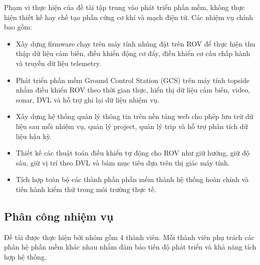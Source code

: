 \documentclass[../DoAn.tex]{subfiles}
\begin{document}
Phạm vi thực hiện của đề tài tập trung vào phát triển phần mềm, không thực hiện thiết kế hay chế tạo phần cứng cơ khí và mạch điện tử. Các nhiệm vụ chính bao gồm:

\begin{itemize}
    \item Xây dựng firmware chạy trên máy tính nhúng đặt trên ROV để thực hiện thu thập dữ liệu cảm biến, điều khiển động cơ đẩy, điều khiển cơ cấu chấp hành và truyền dữ liệu telemetry.
    
    \item Phát triển phần mềm Ground Control Station (GCS) trên máy tính topside nhằm điều khiển ROV theo thời gian thực, hiển thị dữ liệu cảm biến, video, sonar, DVL và hỗ trợ ghi lại dữ liệu nhiệm vụ.
    
    \item Xây dựng hệ thống quản lý thông tin trên nền tảng web cho phép lưu trữ dữ liệu sau mỗi nhiệm vụ, quản lý project, quản lý trip và hỗ trợ phân tích dữ liệu hậu kỳ.
    
    \item Thiết kế các thuật toán điều khiển tự động cho ROV như giữ hướng, giữ độ sâu, giữ vị trí theo DVL và bám mục tiêu dựa trên thị giác máy tính.
    
    \item Tích hợp toàn bộ các thành phần phần mềm thành hệ thống hoàn chỉnh và tiến hành kiểm thử trong môi trường thực tế.
\end{itemize}

\subsection{Phân công nhiệm vụ}
\label{subsection:1.1.3}

Đề tài được thực hiện bởi nhóm gồm 4 thành viên. Mỗi thành viên phụ trách các phân hệ phần mềm khác nhau nhằm đảm bảo tiến độ phát triển và khả năng tích hợp hệ thống.
\end{document}
